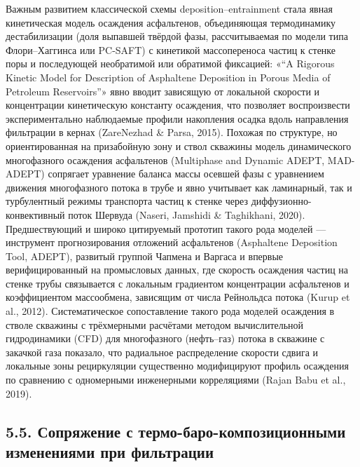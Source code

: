 \documentclass[11pt]{extarticle}
\begin{document}
Важным развитием классической схемы deposition--entrainment стала явная кинетическая модель осаждения асфальтенов, объединяющая термодинамику дестабилизации (доля выпавшей твёрдой фазы, рассчитываемая по модели типа Флори--Хаггинса или PC-SAFT) с кинетикой массопереноса частиц к стенке поры и последующей необратимой или обратимой фиксацией: «``A Rigorous Kinetic Model for Description of Asphaltene Deposition in Porous Media of Petroleum Reservoirs''» явно вводит зависящую от локальной скорости и концентрации кинетическую константу осаждения, что позволяет воспроизвести экспериментально наблюдаемые профили накопления осадка вдоль направления фильтрации в кернах (ZareNezhad \& Parsa, 2015). Похожая по структуре, но ориентированная на призабойную зону и ствол скважины модель динамического многофазного осаждения асфальтенов (Multiphase and Dynamic ADEPT, MAD-ADEPT) сопрягает уравнение баланса массы осевшей фазы с уравнением движения многофазного потока в трубе и явно учитывает как ламинарный, так и турбулентный режимы транспорта частиц к стенке через диффузионно-конвективный поток Шервуда (Naseri, Jamshidi \& Taghikhani, 2020). Предшествующий и широко цитируемый прототип такого рода моделей --- инструмент прогнозирования отложений асфальтенов (Asphaltene Deposition Tool, ADEPT), развитый группой Чапмена и Варгаса и впервые верифицированный на промысловых данных, где скорость осаждения частиц на стенке трубы связывается с локальным градиентом концентрации асфальтенов и коэффициентом массообмена, зависящим от числа Рейнольдса потока (Kurup et al., 2012). Систематическое сопоставление такого рода моделей осаждения в стволе скважины с трёхмерными расчётами методом вычислительной гидродинамики (CFD) для многофазного (нефть--газ) потока в скважине с закачкой газа показало, что радиальное распределение скорости сдвига и локальные зоны рециркуляции существенно модифицируют профиль осаждения по сравнению с одномерными инженерными корреляциями (Rajan Babu et al., 2019).

\subsection{5.5. Сопряжение с термо-баро-композиционными изменениями при фильтрации}\label{ux441ux43eux43fux440ux44fux436ux435ux43dux438ux435-ux441-ux442ux435ux440ux43cux43e-ux431ux430ux440ux43e-ux43aux43eux43cux43fux43eux437ux438ux446ux438ux43eux43dux43dux44bux43cux438-ux438ux437ux43cux435ux43dux435ux43dux438ux44fux43cux438-ux43fux440ux438-ux444ux438ux43bux44cux442ux440ux430ux446ux438ux438}
\end{document}
